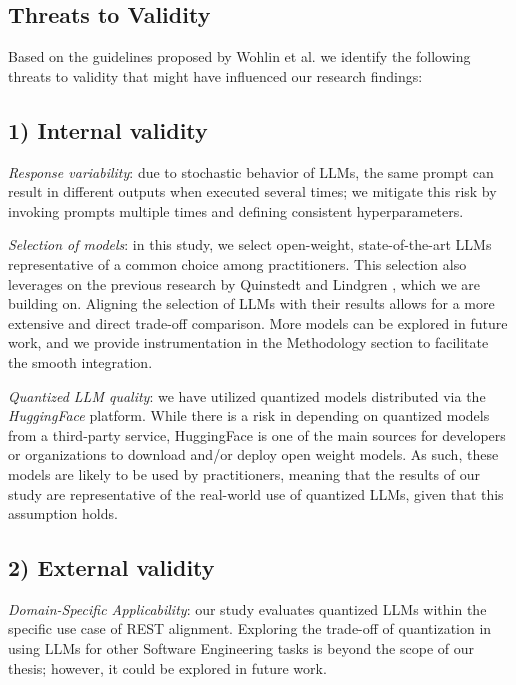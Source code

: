 \documentclass[conference]{IEEEtran}
\begin{document}
\subsection{Threats to Validity}

Based on the guidelines proposed by Wohlin et al. \cite{wohlin2012experimentation} we identify the following threats to validity that might have influenced our research findings: 
\subsection*{\textbf{1) Internal validity}}
    \textit{Response variability}: due to stochastic behavior of LLMs, the same prompt can result in different outputs when executed several times; we mitigate this risk by invoking prompts multiple times and defining consistent hyperparameters.

    \textit{Selection of models}: in this study, we select open-weight, state-of-the-art LLMs representative of a common choice among practitioners. This selection also leverages on the previous research by Quinstedt and Lindgren \cite{quinstedt2024Optimizing}, which we are building on. Aligning the selection of LLMs with their results allows for a more extensive and direct trade-off comparison. More models can be explored in future work, and we provide instrumentation in the Methodology section to facilitate the smooth integration.

    \textit{Quantized LLM quality}: we have utilized quantized models distributed via the \textit{HuggingFace} platform. While there is a risk in depending on quantized models from a third-party service, HuggingFace is one of the main sources for developers or organizations to download and/or deploy open weight models. As such, these models are likely to be used by practitioners, meaning that the results of our study are representative of the real-world use of quantized LLMs, given that this assumption holds.

\subsection*{\textbf{2) External validity}}
    
    \textit{Domain-Specific Applicability}: our study evaluates quantized LLMs within the specific use case of REST alignment. Exploring the trade-off of quantization in using LLMs for other Software Engineering tasks is beyond the scope of our thesis; however, it could be explored in future work.
\end{document}
